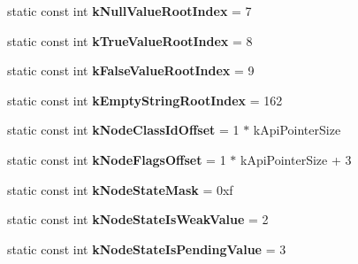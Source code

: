 \begin{DoxyCompactItemize}
\item 
\hypertarget{classv8_1_1internal_1_1_internals_ab311cf753ec5c968052bd83ef21e83f8}{}static const int {\bfseries k\+Null\+Value\+Root\+Index} = 7\label{classv8_1_1internal_1_1_internals_ab311cf753ec5c968052bd83ef21e83f8}

\item 
\hypertarget{classv8_1_1internal_1_1_internals_a93abd58b178eca469bade28e68b5c59e}{}static const int {\bfseries k\+True\+Value\+Root\+Index} = 8\label{classv8_1_1internal_1_1_internals_a93abd58b178eca469bade28e68b5c59e}

\item 
\hypertarget{classv8_1_1internal_1_1_internals_a90b6837aa368bbe4ffd914e6f753b167}{}static const int {\bfseries k\+False\+Value\+Root\+Index} = 9\label{classv8_1_1internal_1_1_internals_a90b6837aa368bbe4ffd914e6f753b167}

\item 
\hypertarget{classv8_1_1internal_1_1_internals_a6f669f3d98fe653b281b26be3bc0655a}{}static const int {\bfseries k\+Empty\+String\+Root\+Index} = 162\label{classv8_1_1internal_1_1_internals_a6f669f3d98fe653b281b26be3bc0655a}

\item 
\hypertarget{classv8_1_1internal_1_1_internals_af4fb6d499cb87f03031ad4d6be6bcd8f}{}static const int {\bfseries k\+Node\+Class\+Id\+Offset} = 1 $\ast$ k\+Api\+Pointer\+Size\label{classv8_1_1internal_1_1_internals_af4fb6d499cb87f03031ad4d6be6bcd8f}

\item 
\hypertarget{classv8_1_1internal_1_1_internals_aee5606f2a44d43d8dafe344e0bb753ef}{}static const int {\bfseries k\+Node\+Flags\+Offset} = 1 $\ast$ k\+Api\+Pointer\+Size + 3\label{classv8_1_1internal_1_1_internals_aee5606f2a44d43d8dafe344e0bb753ef}

\item 
\hypertarget{classv8_1_1internal_1_1_internals_a853acc088978d38a5a69091cf857a46d}{}static const int {\bfseries k\+Node\+State\+Mask} = 0xf\label{classv8_1_1internal_1_1_internals_a853acc088978d38a5a69091cf857a46d}

\item 
\hypertarget{classv8_1_1internal_1_1_internals_a8a5d4cc92a6952c2a50922c77a606e68}{}static const int {\bfseries k\+Node\+State\+Is\+Weak\+Value} = 2\label{classv8_1_1internal_1_1_internals_a8a5d4cc92a6952c2a50922c77a606e68}

\item 
\hypertarget{classv8_1_1internal_1_1_internals_a843b53b17257ecd957eade0d9f21c5ab}{}static const int {\bfseries k\+Node\+State\+Is\+Pending\+Value} = 3\label{classv8_1_1internal_1_1_internals_a843b53b17257ecd957eade0d9f21c5ab}


\end{DoxyCompactItemize}
